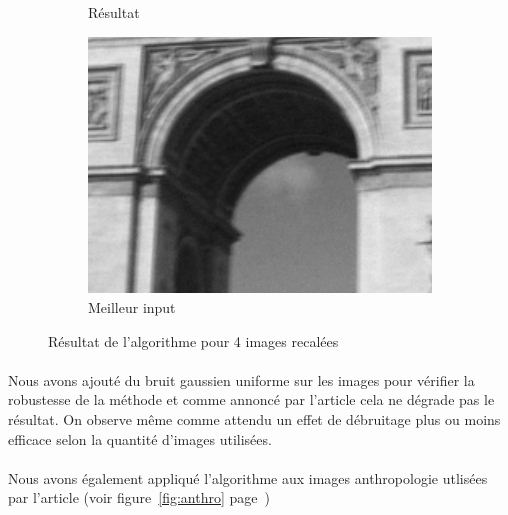 \documentclass[a4paper,10pt]{report}
\begin{document}
\begin{figure}[h]
\begin{subfigure}{0.32\textwidth}
\caption{Résultat}
\label{fig:Resultat}
\end{subfigure}
\begin{subfigure}{0.32\textwidth}
\includegraphics[width=0.9\linewidth]{ressource/detail_flou1.png} 
\caption{Meilleur input}
\label{fig:Bestflou}
\end{subfigure}

\caption{Résultat de l'algorithme pour 4 images recalées}
\label{fig:arctriomphe}
\end{figure}

\paragraph{}
Nous avons ajouté du bruit gaussien uniforme sur les images pour vérifier la robustesse de la méthode
et comme annoncé par l'article cela ne dégrade pas le résultat. On observe même comme attendu un effet
de débruitage plus ou moins efficace selon la quantité d'images utilisées.

\paragraph{}
Nous avons également appliqué l'algorithme aux images anthropologie utlisées par l'article (voir figure~\ref{fig:anthro}
page~\pageref{fig:anthro})
\end{document}
